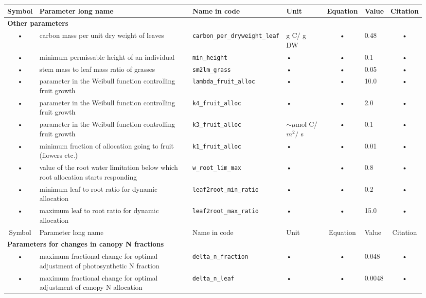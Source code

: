 \begin{table}
\begin{tabularx}{\linewidth}{|c|X|l|l|c|l|c|} %
\hline 
Symbol & Parameter long name & Name in code & Unit & Equation & Value & Citation \\ 
\hline 

\multicolumn{6}{l}{\bf Other parameters}\\
\hline
• & carbon mass per unit dry weight of leaves & \texttt{carbon\_per\_dryweight\_leaf} & g C/ g DW & • & 0.48 & • \\    
• & minimum permissable height of an individual & \texttt{min\_height} & • & • & 0.1 & • \\  
• & stem mass to leaf mass ratio of grasses & \texttt{sm2lm\_grass} & • & • & 0.05 & • \\
• & parameter in the Weibull function controlling fruit growth & \texttt{lambda\_fruit\_alloc} & • & • & 10.0 & • \\
• & parameter in the Weibull function controlling fruit growth & \texttt{k4\_fruit\_alloc} & • & • & 2.0 & • \\
• & parameter in the Weibull function controlling fruit growth & \texttt{k3\_fruit\_alloc} & $\sim\mu$mol C/ $m^2$/ s & • & 0.1 & • \\
• & minimum fraction of allocation going to fruit (flowers etc.) & \texttt{k1\_fruit\_alloc} & • & • & 0.01 & • \\
• & value of the root water limitation below which root allocation starts responding & \texttt{w\_root\_lim\_max} & • & • & 0.8 & • \\
• & minimum leaf to root ratio for dynamic allocation & \texttt{leaf2root\_min\_ratio} & • & • & 0.2 & • \\
• & maximum leaf to root ratio for dynamic allocation & \texttt{leaf2root\_max\_ratio} & • & • & 15.0 & • \\
\hline 
Symbol & Parameter long name & Name in code & Unit & Equation & Value & Citation \\ 
\hline 
\multicolumn{6}{l}{\bf Parameters for changes in canopy N fractions}\\
\hline
 • & maximum fractional change for optimal adjustment of photosynthetic N fraction & \texttt{delta\_n\_fraction} & • & • & 0.048 & • \\ 
 • & maximum fractional change for optimal adjustment of canopy N allocation & \texttt{delta\_n\_leaf} & • & • & 0.0048 & • \\ 
\hline 
\end{tabularx}
\end{table}



\pagebreak

\newpage





